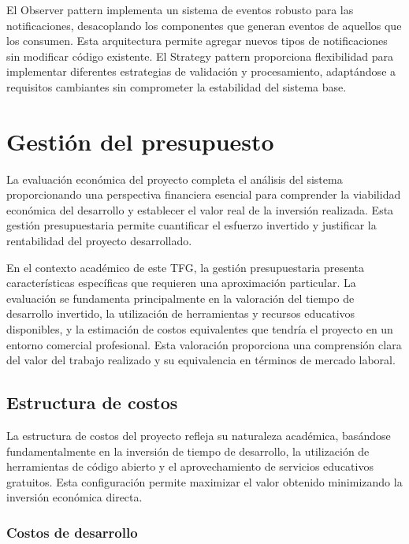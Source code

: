 \documentclass[12pt,a4paper,oneside]{report}
\begin{document}
El Observer pattern implementa un sistema de eventos robusto para las notificaciones, desacoplando los componentes que generan eventos de aquellos que los consumen. Esta arquitectura permite agregar nuevos tipos de notificaciones sin modificar código existente. El Strategy pattern proporciona flexibilidad para implementar diferentes estrategias de validación y procesamiento, adaptándose a requisitos cambiantes sin comprometer la estabilidad del sistema base.

\section{Gestión del presupuesto}\label{gestiuxf3n-del-presupuesto}

La evaluación económica del proyecto completa el análisis del sistema proporcionando una perspectiva financiera esencial para comprender la viabilidad económica del desarrollo y establecer el valor real de la inversión realizada. Esta gestión presupuestaria permite cuantificar el esfuerzo invertido y justificar la rentabilidad del proyecto desarrollado.

En el contexto académico de este TFG, la gestión presupuestaria presenta características específicas que requieren una aproximación particular. La evaluación se fundamenta principalmente en la valoración del tiempo de desarrollo invertido, la utilización de herramientas y recursos educativos disponibles, y la estimación de costos equivalentes que tendría el proyecto en un entorno comercial profesional. Esta valoración proporciona una comprensión clara del valor del trabajo realizado y su equivalencia en términos de mercado laboral.

\subsection{Estructura de costos}\label{estructura-de-costos}

La estructura de costos del proyecto refleja su naturaleza académica, basándose fundamentalmente en la inversión de tiempo de desarrollo, la utilización de herramientas de código abierto y el aprovechamiento de servicios educativos gratuitos. Esta configuración permite maximizar el valor obtenido minimizando la inversión económica directa.

\subsubsection{Costos de desarrollo}\label{costos-de-desarrollo}
\end{document}
